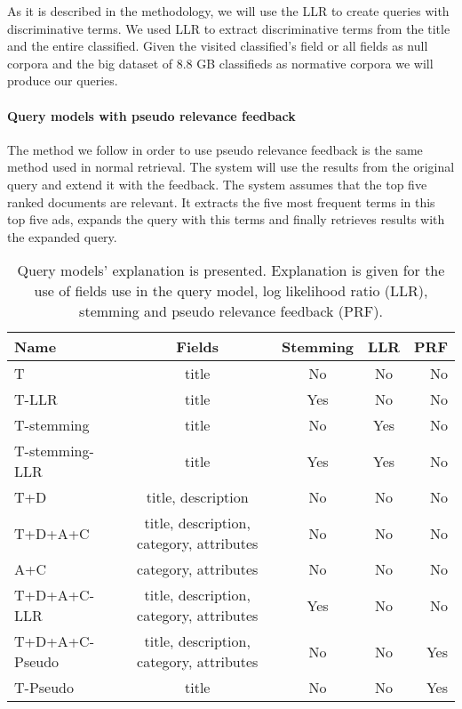 As it is described in the methodology, we will use the LLR to create queries with discriminative terms. We used LLR to extract discriminative terms from the title and the entire classified. Given the visited classified's field or all fields as null corpora and the big dataset of 8.8 GB classifieds as normative corpora we will produce our queries.

 \paragraph{Query models with pseudo relevance feedback}

The method we follow in order to use pseudo relevance feedback is the same method used in normal retrieval. The system will use the results from the original query and extend it with the feedback. The system assumes that the top five ranked documents are relevant. It extracts the five most frequent terms in this top five ads, expands the query with this terms and finally retrieves results with the expanded query.

\begin{table}[H]
\begin{center}
\scriptsize
\caption{Query models' explanation is presented. Explanation is given for the use of fields use in the query model, log likelihood ratio (LLR), stemming and pseudo relevance feedback (PRF).}
\begin{tabular}{lcccr}
\midrule
Name & Fields & Stemming & LLR & PRF \\
\midrule
T & title & No & No & No \\
T-LLR & title & Yes & No & No\\
T-stemming & title & No & Yes & No \\
T-stemming-LLR & title & Yes & Yes & No \\
T+D & title, description & No & No & No \\
T+D+A+C & title, description, category, attributes & No & No & No \\
A+C & category, attributes  & No & No & No \\
T+D+A+C-LLR & title, description, category, attributes & Yes & No & No \\
T+D+A+C-Pseudo & title, description, category, attributes & No & No & Yes\\
T-Pseudo & title & No & No & Yes \\
\bottomrule
\end{tabular}
\end{center}
\end{table}



